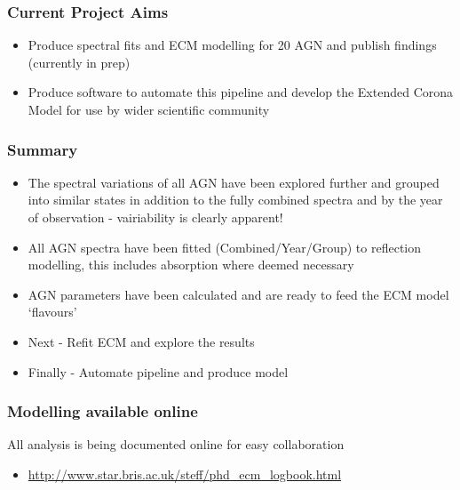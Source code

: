 \documentclass[]{beamer}
\begin{document}
\begin{frame}
\frametitle{Current Project Aims}
\begin{itemize}
    \item Produce spectral fits and ECM modelling for 20 AGN and publish findings (currently in prep)\pause
    \item Produce software to automate this pipeline and develop the Extended Corona Model for use by wider scientific community
    \end{itemize}
    \end{frame}

\begin{frame}
\frametitle{Summary}
\begin{itemize}
    \item The spectral variations of all AGN have been explored further and grouped into similar states in addition to the fully combined spectra and by the year of observation - vairiability is clearly apparent!
    \item All AGN spectra have been fitted (Combined/Year/Group) to reflection modelling, this includes absorption where deemed necessary \pause
    \item AGN parameters have been calculated and are ready to feed the ECM model `flavours'\pause
    \item Next - Refit ECM and explore the results\pause
    \item Finally - Automate pipeline and produce model 
    \end{itemize}
\end{frame}

\begin{frame}
\frametitle{Modelling available online}
All analysis is being documented online for easy collaboration\\
\begin{itemize}
    \item \url{http://www.star.bris.ac.uk/steff/phd_ecm_logbook.html} 
\end{itemize}
\end{frame}
\end{document}
